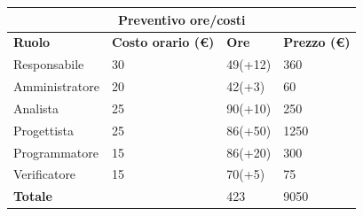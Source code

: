 \documentclass[a4paper, 12pt]{article}
\begin{document}
\begin{center}
	\begin{tabularx}{\textwidth}{|X|X|X|X|}
		\hline
		\multicolumn{4}{|c|}{\textbf{Preventivo ore/costi}}                                      \\
		\hline
		\hline
		\textbf{Ruolo}  & \textbf{Costo orario (\euro)} & \textbf{Ore} & \textbf{Prezzo (\euro)} \\
		\hline
		Responsabile    & 30                            & 49(+12)      & 360                     \\
		\hline
		Amministratore  & 20                            & 42(+3)       & 60                      \\
		\hline
		Analista        & 25                            & 90(+10)      & 250                     \\
		\hline
		Progettista     & 25                            & 86(+50)      & 1250                    \\
		\hline
		Programmatore   & 15                            & 86(+20)      & 300                     \\
		\hline
		Verificatore    & 15                            & 70(+5)       & 75                      \\
		\hline
		\hline
		\textbf{Totale} &                               & 423          & 9050                    \\
		\hline
	\end{tabularx}\\[8pt]
	\mbox{}\\
\end{center}
\end{document}
